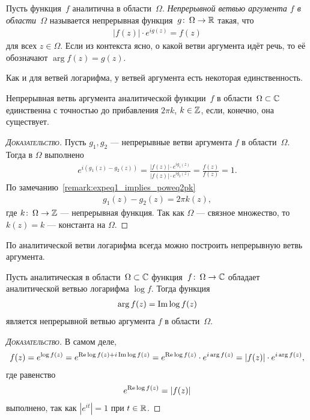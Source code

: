 \documentclass[../complex-analysis.tex]{subfiles}
\begin{document}
\begin{df}
 \label{def:Continious Branch of Argument}
 Пусть функция~$ f $ аналитична в области~$ \Omega $. \textit{Непрерывной ветвью аргумента $ f $ в области~$ \Omega $} называется непрерывная функция~$ g \colon\, \Omega \to \mathbb{R} $ такая, что
 \begin{align*}
  \left| f(z) \right| \cdot e^{i g(z)} = f(z)
 \end{align*} для всех $ z\in\Omega $. Если из контекста ясно, о какой ветви аргумента идёт речь, то её обозначают $ \arg f(z) = g(z) $.
\end{df}

Как и для ветвей логарифма, у ветвей аргумента есть некоторая единственность.

\begin{prop}
 Непрерывная ветвь аргумента аналитической функции~$ f $ в области~$ \Omega \subset \mathbb{C} $ единственна с точностью до прибавления $ 2\pi k $, $ k\in\mathbb{Z} $, если, конечно, она существует.
\end{prop}
\begin{proof}[\normalfont\textsc{Доказательство}]
 Пусть $ g_1,g_2 $ --- непрерывные ветви аргумента $ f $ в области~$ \Omega $. Тогда в $ \Omega $ выполнено
 \begin{align*}
  e^{i(g_1(z) - g_2(z))} = \frac{\left| f(z) \right| \cdot e^{ig_1(z)}}{\left| f(z) \right| \cdot e^{ig_2(z)}} = \frac{f(z)}{f(z)} = 1.
 \end{align*} По замечанию~\ref{remark:expeq1_implies_poweq2pk}
 \begin{align*}
  g_1(z)-g_2(z) = 2\pi k(z),
 \end{align*} где $ k\colon\,\Omega\to\mathbb{Z} $ --- непрерывная функция. Так как $ \Omega $ --- связное множество, то $ k(z) = k $ --- константа на $ \Omega $.
\end{proof}

По аналитической ветви логарифма всегда можно построить непрерывную ветвь аргумента.

\begin{thm}
 \label{theorem:exist_arg_f}
 Пусть аналитическая в области~$ \Omega \subset \mathbb{C} $ функция~$ f\colon\,\Omega\to\mathbb{C} $ обладает аналитической ветвью логарифма $ \log f $. Тогда функция
 \begin{align*}
  \arg f(z) = \operatorname{Im} \log f(z)
 \end{align*} является непрерывной ветвью аргумента $ f $ в области~$ \Omega $.
\end{thm}
\begin{proof}[\normalfont\textsc{Доказательство}]
 В самом деле,
 \begin{align*}
  f(z) = e^{\log f(z)} = e^{\operatorname{Re} \log f(z) + i \operatorname{Im} \log f(z)} = e^{\operatorname{Re} \log f(z)} \cdot e^{i\arg f(z)} = \left| f(z) \right| \cdot e^{i\arg f(z)},
 \end{align*} где равенство
 \begin{align*}
  e^{\operatorname{Re} \log f(z)} = \left| f(z) \right|
 \end{align*} выполнено, так как $ \left| e^{it} \right|=1 $ при $ t \in \mathbb{R} $.
\end{proof}
\end{document}
